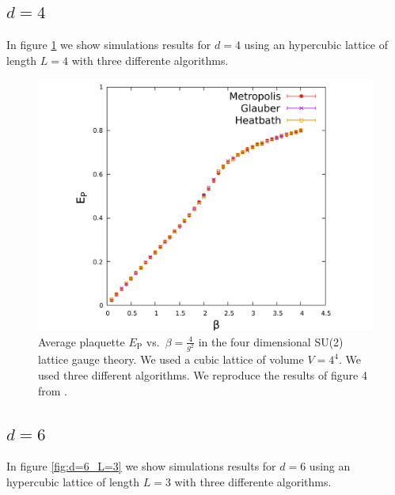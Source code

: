 \documentclass[12pt,a4paper]{article}
\begin{document}
\subsection{$d=4$}
In figure \ref{fig:d=4_L=4} we show simulations results for $d = 4$ using an hypercubic lattice of length $L=4$ with three differente algorithms. 
 
	\begin{figure}
	\label{fig:d=4_L=4}
	\begin{center}
	\includegraphics[scale=0.7]{../images/L=4_metropolis_glauber_heatbath.pdf}
	\caption{Average plaquette $E_{\text{P}}$ vs.\ $\beta=\frac{4}{g^2}$ in the four dimensional SU(2) lattice gauge theory. We used a cubic lattice of volume $V=4^4$. We used three different algorithms. We reproduce the results of figure 4 from \cite{creutz}.}
	\end{center}
	\end{figure}


\subsection{$d=6$}
In figure \ref{fig:d=6_L=3} we show simulations results for $d = 6$ using an hypercubic lattice of length $L=3$ with three differente algorithms. 
 
\end{document}
